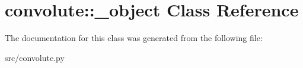 \hypertarget{classconvolute_1_1__object}{
\section{convolute::\_\-object Class Reference}
\label{d8/d53/classconvolute_1_1__object}
}


The documentation for this class was generated from the following file:\begin{DoxyCompactItemize}
\item 
src/convolute.py\end{DoxyCompactItemize}
